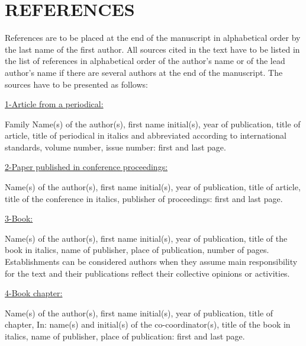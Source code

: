 \section*{REFERENCES}

References are to be placed at the end of the manuscript in alphabetical order by the last name of the first author.  All sources cited in the text have to be listed in the list of references in alphabetical order of the author's name or of the lead author’s name if there are several authors at the end of the manuscript.  The sources have to be presented as follows:

\underline{1-Article from a periodical:} \citet{Herbe1997}

Family Name(s) of the author(s), first name initial(s), year of publication, title of article, title of periodical in italics and abbreviated according to international standards, volume number, issue number: first and last page.

\underline{2-Paper published in conference proceedings:} \citet{Forbes1996}

Name(s) of the author(s), first name initial(s), year of publication, title of article, title of the conference in italics, publisher of proceedings: first and last page.
 
\underline{3-Book:} \citet{Janna1986}

Name(s) of the author(s), first name initial(s), year of publication, title of the book in italics, name of publisher, place of publication, number of pages.  Establishments can be considered authors when they assume main responsibility for the text and their publications reflect their collective opinions or activities.
 
\underline{4-Book chapter:} \citet{Duminil1995}

Name(s) of the author(s), first name initial(s), year of publication, title of chapter, In: name(s) and initial(s) of the co-coordinator(s), title of the book in italics, name of publisher, place of publication: first and last page.

\printbibliography[heading=none]